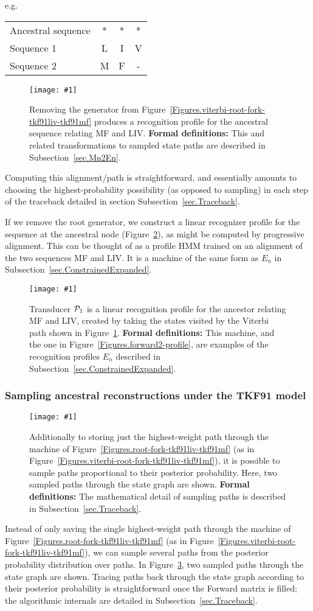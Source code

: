 \documentclass{article}
\newcommand{\secref}[1]{Subsection~\ref{sec.#1}}
\newcommand{\figref}[1]{Figure~\ref{Figures.#1}}
\newcommand{\figlabel}[1]{\label{Figures.#1}}
\newcommand{\easyfig}[4]{
\begin{figure}
\texttt{[image: \#1]}
\caption{ \figlabel{#3} #4}
\end{figure}}
\newcommand{\widepngfig}[2]{\easyfig{#1.png}{width=\textwidth}{#1}{#2}}
\newcommand{\widepdffig}[2]{\easyfig{#1-fig.pdf}{width=\textwidth}{#1}{#2}}
\newcommand{\tallpdffig}[2]{\easyfig{#1-fig.pdf}{height=.8\textheight}{#1}{#2}}
\newcommand\profile{{\cal P}}
\newcommand\formaldefs{{\bf Formal definitions: }}
\begin{document}
e.g.
\begin{tabular}{lccc}
Ancestral sequence & * & * & * \\
Sequence 1         & L & I & V \\
Sequence 2         & M & F & -
\end{tabular}

\widepdffig{viterbi-fork-tkf91liv-tkf91mf}{Removing the generator from \figref{viterbi-root-fork-tkf91liv-tkf91mf} produces a 
recognition profile for the ancestral sequence relating MF and LIV. 
\formaldefs
This and related transformations to sampled state paths are described in \secref{Mn2En}.}

Computing this alignment/path is straightforward, and essentially amounts to choosing
the highest-probability possibility (as opposed to sampling) 
in each step of the traceback detailed in
section \secref{Traceback}.  

If we remove  the root generator, we  construct a linear recognizer profile
for the sequence at the ancestral node (\figref{viterbi-profile}),
as might be computed by progressive alignment.  
This can be thought of as a profile HMM trained on an alignment 
of the two sequences MF and LIV.  
It is a machine of the same form as $E_n$ in \secref{ConstrainedExpanded}.  

\tallpdffig{viterbi-profile}{Transducer $\profile_1$ is a linear recognition profile for the 
ancestor relating MF and LIV, created by taking the states visited by the Viterbi path shown in \figref{viterbi-fork-tkf91liv-tkf91mf}.
\formaldefs
This machine, and the one in \figref{forward2-profile}, are examples of the recognition profiles $E_n$ described in \secref{ConstrainedExpanded}.  }


\subsubsection{Sampling ancestral reconstructions under the TKF91 model}

\widepngfig{forward2-root-fork-tkf91liv-tkf91mf}{
Additionally to storing just the highest-weight path through
the machine of \figref{root-fork-tkf91liv-tkf91mf}
(as in \figref{viterbi-root-fork-tkf91liv-tkf91mf}),
it is possible to sample paths proportional to their posterior probability.  
Here, two sampled paths through the state graph are shown. 
\formaldefs
The mathematical detail of sampling paths is described in \secref{Traceback}.}

Instead of only saving the single highest-weight path through
the machine of \figref{root-fork-tkf91liv-tkf91mf}
(as in \figref{viterbi-root-fork-tkf91liv-tkf91mf}),
we can sample several paths from the posterior probability distribution over paths.  
In \figref{forward2-root-fork-tkf91liv-tkf91mf}, two sampled paths through the 
state graph are shown.  
Tracing paths back through the state graph according to their posterior probability
is straightforward once the Forward matrix is filled; 
the algorithmic internals are detailed in \secref{Traceback}. 
\end{document}
